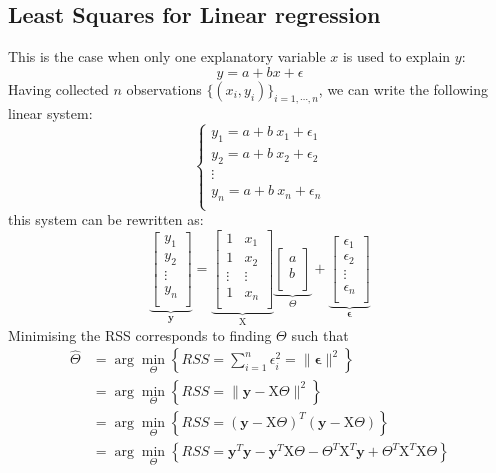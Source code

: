 \documentclass[a4paper,11pt,oneside,onecolumn]{book}
\begin{document}
\subsection{Least Squares for Linear regression}
This is the case when only one explanatory variable $x$ is used to explain $y$:
\begin{equation}
y=a+b x+\epsilon
\end{equation}
Having collected $n$ observations $\lbrace (x_i,y_i)\rbrace_{i=1,\cdots,n}$, we can write the following linear system:
$$
\left\lbrace
\begin{array}{l}
y_1=a+b\ x_1+\epsilon_1\\
y_2=a+b\ x_2+\epsilon_2\\
\vdots\\
y_n=a+b\ x_n+\epsilon_n\\
\end{array}\right.
$$ 
this system can be rewritten as:
$$
\underbrace{
\left\lbrack
\begin{array}{c}
y_1\\
y_2\\
\vdots \\
y_n\\
\end{array}\right\rbrack
}_{\mathbf{y}}
=
\underbrace{
\left\lbrack
\begin{array}{cc}
1 & x_1\\
1&x_2\\
\vdots & \vdots\\
1 & x_n\\
\end{array}\right\rbrack
}_{\mathrm{X}}
\underbrace{
\left\lbrack
\begin{array}{c}
a\\
b\\
\end{array}\right\rbrack
}_{\Theta}
+
\underbrace{
\left\lbrack
\begin{array}{c}
\epsilon_1\\
\epsilon_2\\
\vdots \\
\epsilon_n\\
\end{array}\right\rbrack
}_{\pmb{\epsilon}}
$$ 
Minimising the RSS corresponds to finding $\Theta$ such that 
$$
\begin{array}{ll}
\widehat{\Theta}&=\arg\min_{\Theta} \left\lbrace RSS=\sum_{i=1}^{n}\epsilon_i^2=\|\pmb{\epsilon}\|^2\right\rbrace\\
&=\arg\min_{\Theta} \left\lbrace RSS=\|\mathbf{y}-\mathrm{X}\Theta\|^2\right\rbrace\\
&=\arg\min_{\Theta} \left\lbrace RSS=(\mathbf{y}-\mathrm{X}\Theta)^{T}(\mathbf{y}-\mathrm{X}\Theta)\right\rbrace\\
&=\arg\min_{\Theta} \left\lbrace RSS=\mathbf{y}^{T}\mathbf{y}-\mathbf{y}^{T}\mathrm{X}\Theta-\Theta^{T}\mathrm{X}^{T}\mathbf{y}+\Theta^{T}\mathrm{X}^{T}\mathrm{X}\Theta\right\rbrace\\
\end{array}
$$
\end{document}
